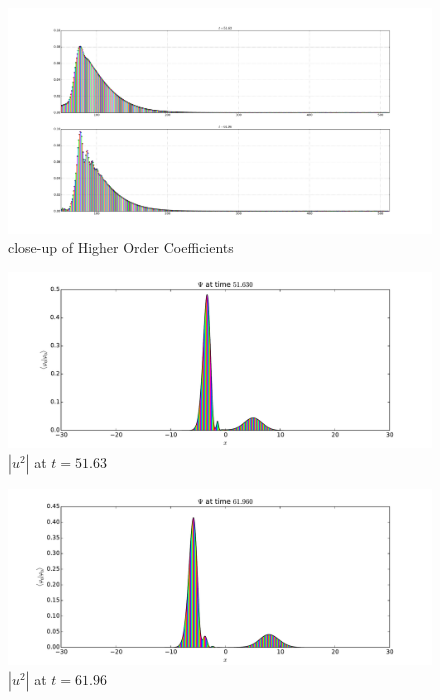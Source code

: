 \begin{figure}
\includegraphics[width=\textwidth]{Figures/tunneling_coeffs_close.pdf}
\caption{close-up of Higher Order Coefficients}
\label{fig:tunneling_coeffs_close}
\end{figure}

\begin{figure}
\includegraphics[width=\textwidth]{Figures/wavepacket_timestep_51_630.pdf}
\caption{$|u^2|$ at $t=51.63$}
\label{fig:wavepacket_at_51_63}
\end{figure}

\begin{figure}
\includegraphics[width=\textwidth]{Figures/wavepacket_timestep_61_960.pdf}
\caption{$|u^2|$ at $t=61.96$}
\label{fig:wavepacket_at_61_96}
\end{figure}
\FloatBarrier